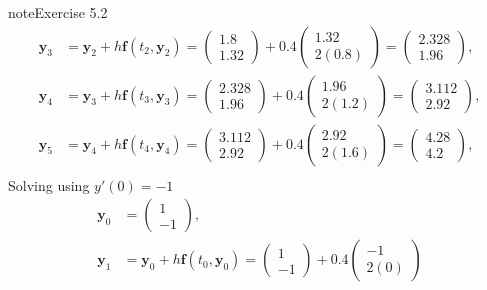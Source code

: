 \documentclass[letterpaper,10pt,english]{jupyterBook}
\begin{document}
\begin{sphinxadmonition}{note}{Exercise 5.2}
\begin{align*}
    \mathbf{y}_3 &= \mathbf{y}_2 + h \mathbf{f}(t_2, \mathbf{y}_2) 
    = \begin{pmatrix} 1.8 \\ 1.32 \end{pmatrix} + 0.4 \begin{pmatrix} 1.32 \\ 2(0.8) \end{pmatrix} 
    = \begin{pmatrix} 2.328 \\ 1.96 \end{pmatrix}, \\
    \mathbf{y}_4 &= \mathbf{y}_3 + h \mathbf{f}(t_3, \mathbf{y}_3) 
    = \begin{pmatrix} 2.328 \\ 1.96 \end{pmatrix} + 0.4 \begin{pmatrix} 1.96 \\ 2(1.2) \end{pmatrix} 
    = \begin{pmatrix} 3.112 \\ 2.92 \end{pmatrix}, \\
    \mathbf{y}_5 &= \mathbf{y}_4 + h \mathbf{f}(t_4, \mathbf{y}_4) 
    = \begin{pmatrix} 3.112 \\ 2.92 \end{pmatrix} + 0.4 \begin{pmatrix} 2.92 \\ 2(1.6) \end{pmatrix} 
    = \begin{pmatrix} 4.28 \\ 4.2 \end{pmatrix}, \\
\end{align*}
\sphinxAtStartPar
Solving using \(y'(0)=-1\)
\begin{align*}
    \mathbf{y}_0 &= \begin{pmatrix} 1 \\ -1 \end{pmatrix}, \\
    \mathbf{y}_1 &= \mathbf{y}_0 + h \mathbf{f}(t_0, \mathbf{y}_0) 
    = \begin{pmatrix} 1 \\ -1 \end{pmatrix} + 0.4 \begin{pmatrix} -1 \\ 2(0) \end{pmatrix} 

\end{align*}
\end{sphinxadmonition}
\end{document}
